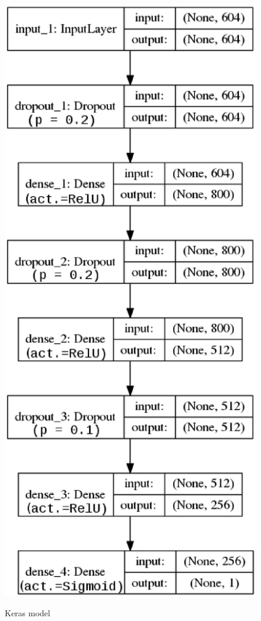 \documentclass[conference]{IEEEtran}
\begin{document}
	\begin{figure}[!htbp]
		
		\centering
		\small
		\includegraphics[scale=0.5]{keras_model2}\\
		
		\caption{Keras model}
		\label{keras_model}
	\end{figure}
	
\end{document}
